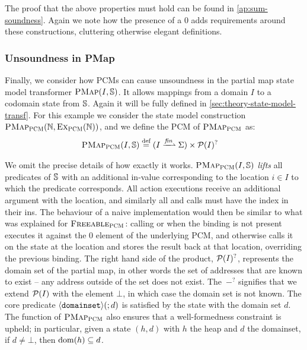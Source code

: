 The proof that the above properties must hold can be found in \cref{ap:sum-soundness}. Again we note how the presence of a $0$ adds requirements around these constructions, cluttering otherwise elegant definitions.

\subsubsection{Unsoundness in PMap}

Finally, we consider how PCMs can cause unsoundness in the partial map state model transformer $\textsc{PMap}(I, \mathbb S)$. It allows mappings from a domain $I$ to a codomain state from $\mathbb S$. Again it will be fully defined in \cref{sec:theory-state-model-transf}. For this example we consider the state model construction $\textsc{PMap}_{\textsc{PCM}}(\mathbb N, \textsc{Ex}_{\textsc{PCM}}(\mathbb N))$, and we define the PCM of $\textsc{PMap}_{\textsc{PCM}}$ as: \begin{align*}
	\PMap_\PCM(I, \mmdl) &\defeq (I \finmap \St) \times \pset(I)^?
\end{align*}

We omit the precise details of how exactly it works. $\textsc{PMap}_{\textsc{PCM}}(I,\mathbb S)$ \emph{lifts} all predicates of $\mathbb S$ with an additional in-value corresponding to the location $i\in I$ to which the predicate corresponds. All action executions receive an additional argument with the location, and similarly all \consume{} and \produce{} calls must have the index in their ins. The behaviour of a naive implementation would then be similar to what was explained for $\textsc{Freeable}_{\textsc{PCM}}$: calling \consume{} or \produce{} when the binding is not present executes it against the $0$ element of the underlying PCM, and otherwise calls it on the state at the location and stores the result back at that location, overriding the previous binding. The right hand side of the product, ${\cal P}(I)^?$, represents the domain set of the partial map, in other words the set of addresses that are known to exist -- any address outside of the set does not exist. The~$-^?$ signifies that we extend ${\cal P}(I)$ with the element $\bot$, in which case the domain set is not known. The core predicate $\left<\texttt{domainset}\right>\!(;d)$ is satisfied by the state with the domain set $d$. The \produce{} function of $\textsc{PMap}_{\textsc{PCM}}$ also ensures that a well-formedness constraint is upheld; in particular, given a state $(h,d)$ with $h$ the heap and $d$ the domainset, if $d\neq\bot$, then $\operatorname{dom}(h)\subseteq d$.

